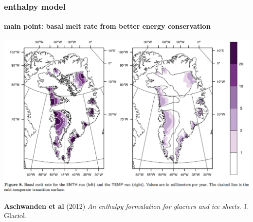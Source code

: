 \documentclass[hide notes,intlimits]{beamer}
\begin{document}
\begin{frame}
  \frametitle{enthalpy model}
  \framesubtitle{main point: basal melt rate from better energy conservation}

  \begin{center}
    \includegraphics[height=0.7\textheight]{enthalpy-model.png}
  \end{center}

  \begin{flushleft}
  \tiny \textbf{Aschwanden et al} (2012) \emph{An enthalpy
      formulation for glaciers and ice sheets}. J. Glaciol.
 \end{flushleft}
\end{frame}
\end{document}

